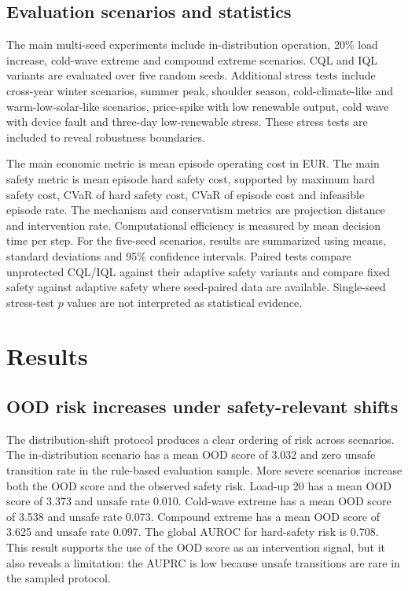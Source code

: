 \documentclass[preprint,12pt]{elsarticle}
\begin{document}
\subsection{Evaluation scenarios and statistics}

The main multi-seed experiments include in-distribution operation, 20\% load increase, cold-wave extreme and compound extreme scenarios. CQL and IQL variants are evaluated over five random seeds. Additional stress tests include cross-year winter scenarios, summer peak, shoulder season, cold-climate-like and warm-low-solar-like scenarios, price-spike with low renewable output, cold wave with device fault and three-day low-renewable stress. These stress tests are included to reveal robustness boundaries.

The main economic metric is mean episode operating cost in EUR. The main safety metric is mean episode hard safety cost, supported by maximum hard safety cost, CVaR of hard safety cost, CVaR of episode cost and infeasible episode rate. The mechanism and conservatism metrics are projection distance and intervention rate. Computational efficiency is measured by mean decision time per step. For the five-seed scenarios, results are summarized using means, standard deviations and 95\% confidence intervals. Paired tests compare unprotected CQL/IQL against their adaptive safety variants and compare fixed safety against adaptive safety where seed-paired data are available. Single-seed stress-test $p$ values are not interpreted as statistical evidence.

\section{Results}

\subsection{OOD risk increases under safety-relevant shifts}

The distribution-shift protocol produces a clear ordering of risk across scenarios. The in-distribution scenario has a mean OOD score of 3.032 and zero unsafe transition rate in the rule-based evaluation sample. More severe scenarios increase both the OOD score and the observed safety risk. Load-up 20 has a mean OOD score of 3.373 and unsafe rate 0.010. Cold-wave extreme has a mean OOD score of 3.538 and unsafe rate 0.073. Compound extreme has a mean OOD score of 3.625 and unsafe rate 0.097. The global AUROC for hard-safety risk is 0.708. This result supports the use of the OOD score as an intervention signal, but it also reveals a limitation: the AUPRC is low because unsafe transitions are rare in the sampled protocol.
\end{document}
